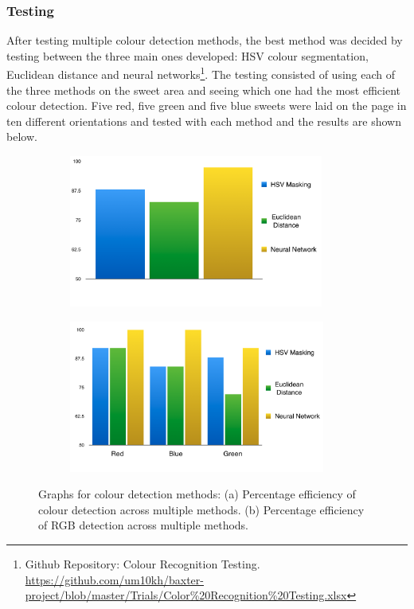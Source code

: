 \subsubsection{Testing}
After testing multiple colour detection methods, the best method was decided by testing between the three main ones developed: HSV colour segmentation, Euclidean distance and neural networks\footnote{Github Repository: Colour Recognition Testing. \url{https://github.com/um10kh/baxter-project/blob/master/Trials/Color\%20Recognition\%20Testing.xlsx}}. The testing consisted of using each of the three methods on the sweet area and seeing which one had the most efficient colour detection. Five red, five green and five blue sweets were laid on the page in ten different orientations and tested with each method and the results are shown below.
\begin{figure}[H]
    \captionsetup[subfigure]{justification=centering}
    \begin{subfigure}[H]{0.475\textwidth}   
        \centering 
        \caption{}
        \includegraphics[width=\textwidth, height=5cm]{colourefficiency.png}
        \label{fig:colefficiency}
    \end{subfigure}
    \begin{subfigure}[H]{0.475\textwidth}   
        \centering 
        \caption{}
        \includegraphics[width=\textwidth, height=5cm]{RGBtesting.png}
        \label{fig:rgbtests}
    \end{subfigure}
    \vspace{-0.5cm}
    \caption{Graphs for colour detection methods: (a) Percentage efficiency of colour detection across multiple methods. (b) Percentage efficiency of RGB detection across multiple methods.}
\end{figure}
